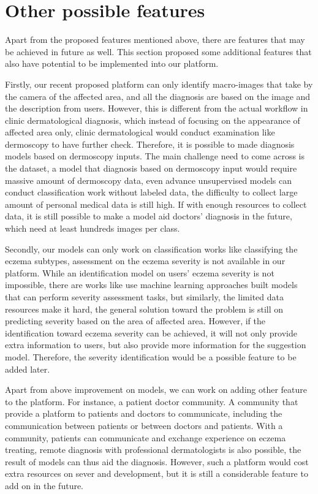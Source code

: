 \section{Other possible features}
Apart from the proposed features mentioned above, there are features that may be achieved in future as well. This section proposed some additional features that also have potential to be implemented into our platform.

Firstly, our recent proposed platform can only identify macro-images that take by the camera of the affected area, and all the diagnosis are based on the image and the description from users. However, this is different from the actual workflow in clinic dermatological diagnosis, which instead of focusing on the appearance of affected area only, clinic dermatological would conduct examination like dermoscopy to have further check. Therefore, it is possible to made diagnosis models based on dermoscopy inputs. The main challenge need to come across is the dataset, a model that diagnosis based on dermoscopy input would require massive amount of dermoscopy data, even advance unsupervised models can conduct classification work without labeled data, the difficulty to collect large amount of personal medical data is still high. If with enough resources to collect data, it is still possible to make a model aid doctors' diagnosis in the future, which need at least hundreds images per class.

Secondly, our models can only work on classification works like classifying the eczema subtypes, assessment on the eczema severity is not available in our platform. While an identification model on users' eczema severity is not impossible, there are works like \cite{ATTAR2023100213}\cite{10.1007/978-3-030-59861-7_23} use machine learning approaches built models that can perform severity assessment tasks, but similarly, the limited data resources make it hard, the general solution toward the problem is still on predicting severity based on the area of affected area. However, if the identification toward eczema severity can be achieved, it will not only provide extra information to users, but also provide more information for the suggestion model. Therefore, the severity identification would be a possible feature to be added later.

Apart from above improvement on models, we can work on adding other feature to the platform. For instance, a patient doctor community. A community that provide a platform to patients and doctors to communicate, including the communication between patients or between doctors and patients. With a community, patients can communicate and exchange experience on eczema treating, remote diagnosis with professional dermatologists is also possible, the result of models can thus aid the diagnosis. However, such a platform would cost extra resources on sever and development, but it is still a considerable feature to add on in the future.


